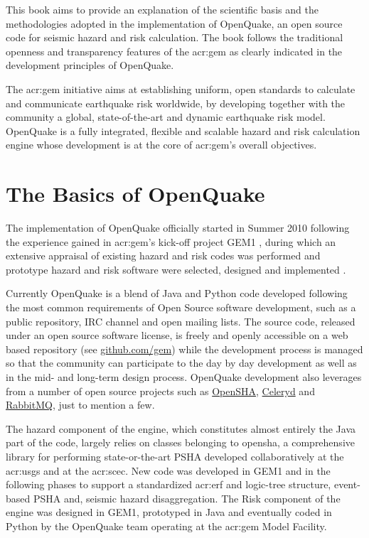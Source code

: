 This book aims to provide an explanation of the scientific basis 
and the methodologies adopted in the implementation of OpenQuake, an open 
source code for seismic hazard and risk calculation. 
%
The book follows the traditional openness and transparency features of the 
\gls{acr:gem} as clearly indicated in the development principles of 
OpenQuake. 

%
The \gls{acr:gem} initiative aims at establishing uniform, open 
standards to calculate and communicate earthquake risk worldwide, by 
developing together with the community a global, state-of-the-art and 
dynamic earthquake risk model. 
%
OpenQuake is a fully integrated, flexible and scalable hazard and risk 
calculation engine whose development is at the core of \gls{acr:gem}'s
overall objectives.
\section{The Basics of OpenQuake}
The implementation of OpenQuake officially started in Summer 2010 
following the experience gained in \gls{acr:gem}'s kick-off project GEM1 
\citep{gemfoundation2010}, during which an extensive appraisal of existing hazard 
and risk codes was performed \citep{danciu2010,crowley2010}
and prototype hazard and risk software were selected, designed and
implemented \citep{pagani2010,crowley2010a}.

Currently OpenQuake is a blend of Java and Python code developed 
following the most common requirements of Open Source 
software development, such as a public repository, IRC channel and open mailing lists. 
The source code, released under an open source software license,
is freely and openly accessible on a web based repository 
(see \href{http://github.com/gem}{github.com/gem}) while the 
development process is managed so that the community can participate 
to the day by day development as well as in the mid- and long-term 
design process. 
%
OpenQuake development also leverages from a number of open source projects 
such as \href{http://www.opensha.org}{OpenSHA}, \href {http://celeryproject.org}{Celeryd} and \href{http://www.rabbitmq.com}{RabbitMQ}, just to mention a few.

The hazard component of the engine, which constitutes almost entirely
the Java part of the code, largely relies on classes belonging to 
\gls{opensha}, a comprehensive library for performing state-or-the-art
PSHA developed collaboratively at the \gls{acr:usgs} and at the 
\gls{acr:scec}. New code was developed in GEM1 and in the following 
phases to support a standardized \gls{acr:erf} and logic-tree structure, 
event-based PSHA and, seismic hazard disaggregation.
%
The Risk component of the engine was designed in GEM1, prototyped in Java and eventually
coded in Python by the OpenQuake team operating at the \gls{acr:gem} 
Model Facility.


